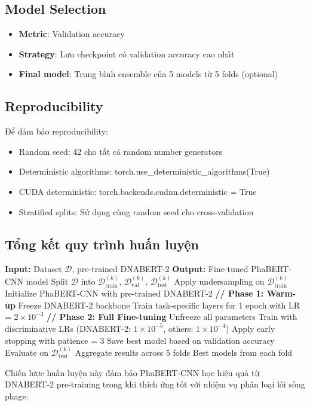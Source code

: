 \subsection{Model Selection}

\begin{itemize}
    \item \textbf{Metric}: Validation accuracy
    \item \textbf{Strategy}: Lưu checkpoint có validation accuracy cao nhất
    \item \textbf{Final model}: Trung bình ensemble của 5 models từ 5 folds (optional)
\end{itemize}

\subsection{Reproducibility}

Để đảm bảo reproducibility:
\begin{itemize}
    \item Random seed: 42 cho tất cả random number generators
    \item Deterministic algorithms: torch.use\_deterministic\_algorithms(True)
    \item CUDA deterministic: torch.backends.cudnn.deterministic = True
    \item Stratified splits: Sử dụng cùng random seed cho cross-validation
\end{itemize}

\subsection{Tổng kết quy trình huấn luyện}

\begin{algorithm}[h]
\caption{PhaBERT-CNN Training Pipeline}
\label{alg:training}
\begin{algorithmic}[1]
\State \textbf{Input:} Dataset $\mathcal{D}$, pre-trained DNABERT-2
\State \textbf{Output:} Fine-tuned PhaBERT-CNN model
    \State Split $\mathcal{D}$ into $\mathcal{D}_{\text{train}}^{(k)}$, $\mathcal{D}_{\text{val}}^{(k)}$, $\mathcal{D}_{\text{test}}^{(k)}$
    \State Apply undersampling on $\mathcal{D}_{\text{train}}^{(k)}$
    \State Initialize PhaBERT-CNN with pre-trained DNABERT-2
    \State \textbf{// Phase 1: Warm-up}
    \State Freeze DNABERT-2 backbone
    \State Train task-specific layers for 1 epoch with LR = $2 \times 10^{-3}$
    \State \textbf{// Phase 2: Full Fine-tuning}
    \State Unfreeze all parameters
    \State Train with discriminative LRs (DNABERT-2: $1 \times 10^{-5}$, others: $1 \times 10^{-4}$)
    \State Apply early stopping with patience = 3
    \State Save best model based on validation accuracy
    \State Evaluate on $\mathcal{D}_{\text{test}}^{(k)}$
\EndFor
\State Aggregate results across 5 folds
\State \Return Best models from each fold
\end{algorithmic}
\end{algorithm}

Chiến lược huấn luyện này đảm bảo PhaBERT-CNN học hiệu quả từ DNABERT-2 pre-training trong khi thích ứng tốt với nhiệm vụ phân loại lối sống phage.
